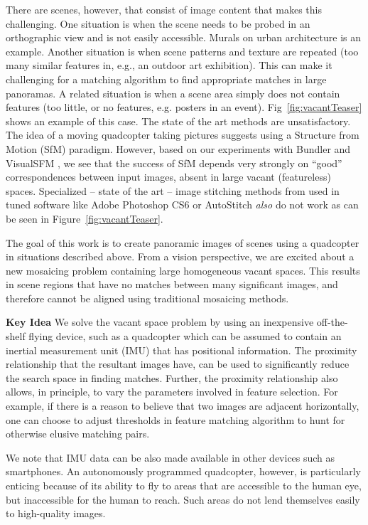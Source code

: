 There are scenes, however, that consist of image content that makes
this challenging.  One situation is when the scene needs to be probed
in an orthographic view and is not easily accessible.  Murals on
urban architecture is an example. Another situation is when scene
patterns and texture are repeated (too many similar features in, e.g.,
an outdoor art exhibition).  This can make it challenging for a
matching algorithm to find appropriate matches in large panoramas.  A
related situation is when a scene area simply does not contain
features (too little, or no features, e.g. posters in an event).
Fig~\ref{fig:vacantTeaser} shows an example of this case.  The state of the
art methods are unsatisfactory.  The idea of a moving quadcopter
taking pictures suggests using a Structure from Motion (SfM) paradigm.
However, based on our experiments with Bundler\cite{Snavely06,
  Snavely07} and VisualSFM \cite{Wu13}, we see that the success of SfM
depends very strongly on ``good'' correspondences between input
images, absent in large vacant (featureless) spaces. Specialized -- state of the art -- image stitching 
methods from \cite{Brown03, Brown05} used in tuned software like Adobe 
Photoshop CS6 or AutoStitch \emph{also} do not work as can be seen 
in Figure~\ref{fig:vacantTeaser}.


The goal of this work is to create panoramic images of scenes using a
quadcopter in situations described above. From a vision perspective,
we are excited about a new mosaicing problem containing large
homogeneous vacant spaces.  This results in scene regions that have no
matches between many significant images, and therefore cannot be
aligned using traditional mosaicing methods.


{\bf Key Idea} We solve the vacant space problem by using
an inexpensive off-the-shelf flying device, such as a quadcopter which
can be assumed to contain an inertial measurement unit (IMU) that has
positional information.  The proximity relationship that the resultant
images have, can be used to significantly reduce the search space in
finding matches.  Further, the proximity relationship also allows, in
principle, to vary the parameters involved in feature selection. For
example, if there is a reason to believe that two images are adjacent
horizontally, one can choose to adjust thresholds in feature matching
algorithm to hunt for otherwise elusive matching pairs.

We note that IMU data can be also made available in other devices such
as smartphones.  An autonomously programmed quadcopter, however, is
particularly enticing because of its ability to fly to areas that are
accessible to the human eye, but inaccessible for the human to
reach. Such areas do not lend themselves easily to high-quality
images. 

